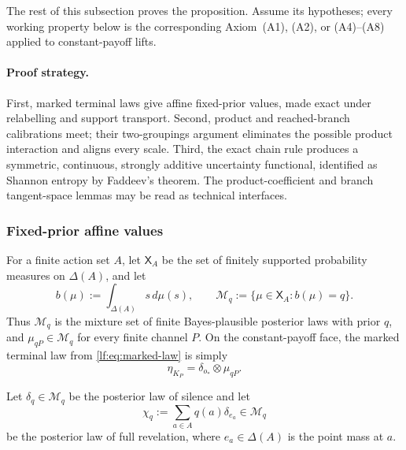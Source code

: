 \documentclass[11pt,a4paper]{article}
\theoremstyle{definition}
\newcommand{\D}{\Delta}
\newcommand{\1}{\mathbf 1}
\begin{document}
The rest of this subsection proves the proposition.  Assume its hypotheses;
every working property below is the corresponding Axiom~\textup{(A1)},
\textup{(A2)}, or \textup{(A4)--(A8)} applied to constant-payoff lifts.

\paragraph{Proof strategy.}
First, marked terminal laws give affine fixed-prior values, made exact under
relabelling and support transport.  Second, product and reached-branch
calibrations meet; their two-groupings argument eliminates the possible
product interaction and aligns every scale.  Third, the exact chain rule
produces a symmetric, continuous, strongly additive uncertainty functional,
identified as Shannon entropy by Faddeev's theorem.  The product-coefficient
and branch tangent-space lemmas may be read as technical interfaces.

\subsubsection{Fixed-prior affine values}

For a finite action set $A$, let $\mathsf X_A$ be the set of finitely
supported probability measures on $\Delta(A)$, and let
\[
 b(\mu):=\int_{\Delta(A)}s\,d\mu(s),
 \qquad
 \mathcal M_q:=\{\mu\in\mathsf X_A:b(\mu)=q\}.
\]
Thus $\mathcal M_q$ is the mixture set of finite Bayes-plausible posterior
laws with prior $q$, and $\mu_{qP}\in\mathcal M_q$ for every finite channel
$P$.  On the constant-payoff face, the marked terminal law from
\eqref{lf:eq:marked-law} is simply
\begin{equation}
 \eta_{K_P}=\delta_{o_\ast}\otimes\mu_{qP}.
 \label{pt:eq:pure-marked-law}
\end{equation}

Let $\delta_q\in\mathcal M_q$ be the posterior law of silence and let
\[
 \chi_q:=\sum_{a\in A}q(a)\delta_{e_a}\in\mathcal M_q
\]
be the posterior law of full revelation, where $e_a\in\D(A)$ is the point mass at $a$.
\end{document}
